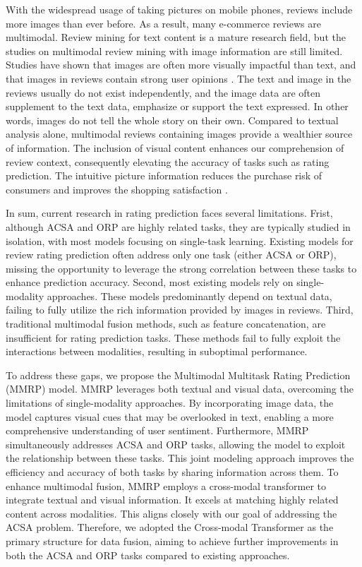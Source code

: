 \documentclass[preprint,12pt]{elsarticle}
\begin{document}
With the widespread usage of taking pictures on mobile phones, reviews include more images than ever before. As a result, many e-commerce reviews are multimodal. Review mining for text content is a mature research field, but the studies on multimodal review mining with image information are still limited. Studies have shown that images are often more visually impactful than text, and that images in reviews contain strong user opinions \citep{you2016cross,luo2015examining}. The text and image in the reviews usually do not exist independently, and the image data are often supplement to the text data, emphasize or support the text expressed. In other words, images do not tell the whole story on their own. Compared to textual analysis alone, multimodal reviews containing images provide a wealthier source of information. The inclusion of visual content enhances our comprehension of review context, consequently elevating the accuracy of tasks such as rating prediction. The intuitive picture information reduces the purchase risk of consumers and improves the shopping satisfaction \citep{truong2017visual}. 

In sum, current research in rating prediction faces several limitations. Frist, although ACSA and ORP are highly related tasks, they are typically studied in isolation, with most models focusing on single-task learning. Existing models for review rating prediction often address only one task (either ACSA or ORP), missing the opportunity to leverage the strong correlation between these tasks to enhance prediction accuracy. Second, most existing models rely on single-modality approaches. These models predominantly depend on textual data, failing to fully utilize the rich information provided by images in reviews. Third, traditional multimodal fusion methods, such as feature concatenation, are insufficient for rating prediction tasks. These methods fail to fully exploit the interactions between modalities, resulting in suboptimal performance. 

To address these gaps, we propose the Multimodal Multitask Rating Prediction (MMRP) model. MMRP leverages both textual and visual data, overcoming the limitations of single-modality approaches. By incorporating image data, the model captures visual cues that may be overlooked in text, enabling a more comprehensive understanding of user sentiment. Furthermore, MMRP simultaneously addresses ACSA and ORP tasks, allowing the model to exploit the relationship between these tasks. This joint modeling approach improves the efficiency and accuracy of both tasks by sharing information across them. To enhance multimodal fusion, MMRP employs a cross-modal transformer to integrate textual and visual information. It excels at matching highly related content across modalities. This aligns closely with our goal of addressing the ACSA problem. Therefore, we adopted the Cross-modal Transformer as the primary structure for data fusion, aiming to achieve further improvements in both the ACSA and ORP tasks compared to existing approaches.
\end{document}
